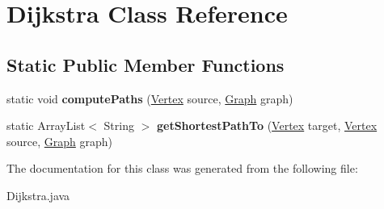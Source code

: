 \hypertarget{class_dijkstra}{\section{Dijkstra Class Reference}
\label{class_dijkstra}
}
\subsection*{Static Public Member Functions}
\begin{DoxyCompactItemize}
\item 
\hypertarget{class_dijkstra_a51d03e229ce98b3ef56dc1ceb178192f}{static void {\bfseries compute\+Paths} (\hyperlink{class_vertex}{Vertex} source, \hyperlink{class_graph}{Graph} graph)}\label{class_dijkstra_a51d03e229ce98b3ef56dc1ceb178192f}

\item 
\hypertarget{class_dijkstra_a5c7efba36207a7884685b07854459090}{static Array\+List$<$ String $>$ {\bfseries get\+Shortest\+Path\+To} (\hyperlink{class_vertex}{Vertex} target, \hyperlink{class_vertex}{Vertex} source, \hyperlink{class_graph}{Graph} graph)}\label{class_dijkstra_a5c7efba36207a7884685b07854459090}

\end{DoxyCompactItemize}


The documentation for this class was generated from the following file\+:\begin{DoxyCompactItemize}
\item 
Dijkstra.\+java\end{DoxyCompactItemize}

